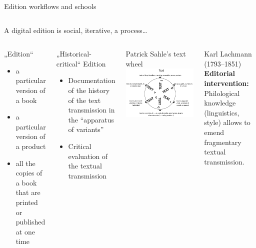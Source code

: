 \begin{frame}[allowframebreaks]{Edition workflows and schools}
\begin{columns}
\alert{A digital edition is social, iterative, a process\dots }
\end{columns}

\framebreak


\begin{columns}
\begin{block}{„Edition“}
\begin{itemize}
\item  a particular version of a book
\item  a particular version of a product
\item  all the copies of a book that are printed or published at one time
\end{itemize}
\end{block}

\begin{block}{„Historical-critical“ Edition}
\begin{itemize}
\item  Documentation of the history of the text
transmission in the “apparatus of variants”
\item  Critical evaluation of the textual transmission
\end{itemize}
\end{block}

\begin{block}{Patrick Sahle's text wheel}
\includegraphics[width=\textwidth]{img/sahle-text-wheel.png}
\end{block}

\begin{block}{Karl Lachmann (1793--1851)}
\textbf{Editorial intervention:} Philological knowledge (linguistics, style) allows to emend fragmentary textual transmission.
\end{block}
\end{columns}



\end{frame}
